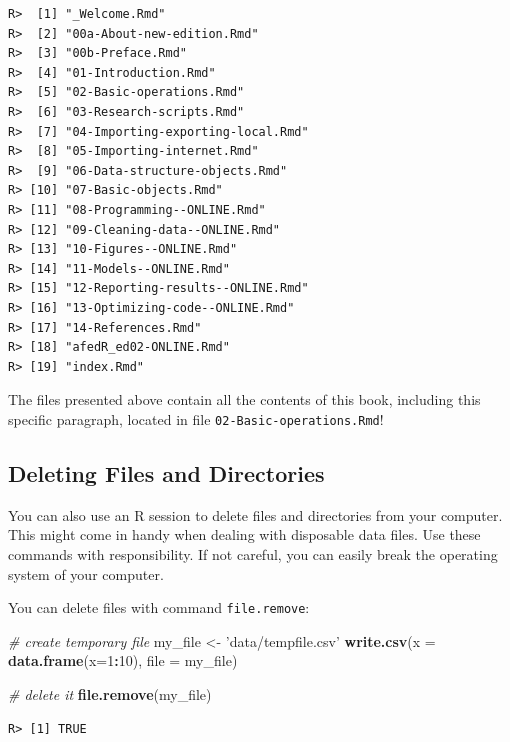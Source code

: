 \documentclass[
  12pt,
]{book}
\newenvironment{Shaded}{\begin{snugshade}}{\end{snugshade}}
\newcommand{\CommentTok}[1]{\textcolor[rgb]{0.37,0.37,0.37}{\textit{#1}}}
\newcommand{\DataTypeTok}[1]{\textcolor[rgb]{0.27,0.27,0.27}{#1}}
\newcommand{\DecValTok}[1]{\textcolor[rgb]{0.06,0.06,0.06}{#1}}
\newcommand{\KeywordTok}[1]{\textcolor[rgb]{0.27,0.27,0.27}{\textbf{#1}}}
\newcommand{\NormalTok}[1]{#1}
\newcommand{\OperatorTok}[1]{\textcolor[rgb]{0.43,0.43,0.43}{\textbf{#1}}}
\newcommand{\StringTok}[1]{\textcolor[rgb]{0.5,0.5,0.5}{#1}}
\begin{document}
\begin{verbatim}
R>  [1] "_Welcome.Rmd"                    
R>  [2] "00a-About-new-edition.Rmd"       
R>  [3] "00b-Preface.Rmd"                 
R>  [4] "01-Introduction.Rmd"             
R>  [5] "02-Basic-operations.Rmd"         
R>  [6] "03-Research-scripts.Rmd"         
R>  [7] "04-Importing-exporting-local.Rmd"
R>  [8] "05-Importing-internet.Rmd"       
R>  [9] "06-Data-structure-objects.Rmd"   
R> [10] "07-Basic-objects.Rmd"            
R> [11] "08-Programming--ONLINE.Rmd"      
R> [12] "09-Cleaning-data--ONLINE.Rmd"    
R> [13] "10-Figures--ONLINE.Rmd"          
R> [14] "11-Models--ONLINE.Rmd"           
R> [15] "12-Reporting-results--ONLINE.Rmd"
R> [16] "13-Optimizing-code--ONLINE.Rmd"  
R> [17] "14-References.Rmd"               
R> [18] "afedR_ed02-ONLINE.Rmd"           
R> [19] "index.Rmd"
\end{verbatim}

The files presented above contain all the contents of this book, including this specific paragraph, located in file \texttt{02-Basic-operations.Rmd}!

\hypertarget{deleting-files-and-directories}{%
\subsection{Deleting Files and Directories}\label{deleting-files-and-directories}}

You can also use an R session to delete files and directories from your computer. This might come in handy when dealing with disposable data files. Use these commands with responsibility. If not careful, you can easily break the operating system of your computer.

You can delete files with command \texttt{file.remove}:

\begin{Shaded}
\begin{Highlighting}[]
\CommentTok{# create temporary file}
\NormalTok{my_file <-}\StringTok{ 'data/tempfile.csv'}
\KeywordTok{write.csv}\NormalTok{(}\DataTypeTok{x =} \KeywordTok{data.frame}\NormalTok{(}\DataTypeTok{x=}\DecValTok{1}\OperatorTok{:}\DecValTok{10}\NormalTok{),}
          \DataTypeTok{file =}\NormalTok{ my_file)}

\CommentTok{# delete it}
\KeywordTok{file.remove}\NormalTok{(my_file)}
\end{Highlighting}
\end{Shaded}

\begin{verbatim}
R> [1] TRUE
\end{verbatim}
\end{document}
